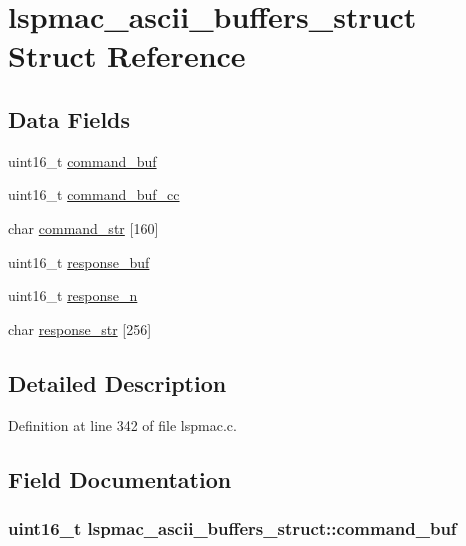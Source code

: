 \hypertarget{structlspmac__ascii__buffers__struct}{\section{lspmac\-\_\-ascii\-\_\-buffers\-\_\-struct Struct Reference}
\label{structlspmac__ascii__buffers__struct}
}
\subsection*{Data Fields}
\begin{DoxyCompactItemize}
\item 
uint16\-\_\-t \hyperlink{structlspmac__ascii__buffers__struct_ad92fe7e16e5e67ec4c115a6b86890faa}{command\-\_\-buf}
\item 
uint16\-\_\-t \hyperlink{structlspmac__ascii__buffers__struct_a4d11efeb1eef407d811d3f9b774adc54}{command\-\_\-buf\-\_\-cc}
\item 
char \hyperlink{structlspmac__ascii__buffers__struct_abe6a433dd9be4781dbf7e31d16484a4b}{command\-\_\-str} \mbox{[}160\mbox{]}
\item 
uint16\-\_\-t \hyperlink{structlspmac__ascii__buffers__struct_ae1d37cf9568478c9d8dad540ce77183c}{response\-\_\-buf}
\item 
uint16\-\_\-t \hyperlink{structlspmac__ascii__buffers__struct_a97c2fdd21eec29c2cba993e361c3c069}{response\-\_\-n}
\item 
char \hyperlink{structlspmac__ascii__buffers__struct_a32c4baecf20143eb71d348b6b5679039}{response\-\_\-str} \mbox{[}256\mbox{]}
\end{DoxyCompactItemize}


\subsection{Detailed Description}


Definition at line 342 of file lspmac.\-c.



\subsection{Field Documentation}
\hypertarget{structlspmac__ascii__buffers__struct_ad92fe7e16e5e67ec4c115a6b86890faa}{
\subsubsection[{command\-\_\-buf}]{\setlength{\rightskip}{0pt plus 5cm}uint16\-\_\-t lspmac\-\_\-ascii\-\_\-buffers\-\_\-struct\-::command\-\_\-buf}}\label{structlspmac__ascii__buffers__struct_ad92fe7e16e5e67ec4c115a6b86890faa}


